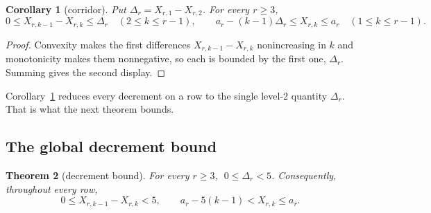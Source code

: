 \documentclass[11pt,a4paper]{article}
\theoremstyle{plain}
\newtheorem{theorem}{Theorem}[section]
\newtheorem{corollary}[theorem]{Corollary}
\theoremstyle{definition}
\theoremstyle{remark}
\begin{document}
\begin{corollary}[corridor]\label{cor:corridor}
Put $\Delta_r=X_{r,1}-X_{r,2}$. For every $r\ge3$,
\[
  0\le X_{r,k-1}-X_{r,k}\le\Delta_r\quad(2\le k\le r-1),
  \qquad
  a_r-(k-1)\Delta_r\le X_{r,k}\le a_r\quad(1\le k\le r-1).
\]
\end{corollary}

\begin{proof}
Convexity makes the first differences $X_{r,k-1}-X_{r,k}$ nonincreasing in $k$
and monotonicity makes them nonnegative, so each is bounded by the first one,
$\Delta_r$. Summing gives the second display.
\end{proof}

Corollary~\ref{cor:corridor} reduces every decrement on a row to the single
level-2 quantity $\Delta_r$. That is what the next theorem bounds.

\subsection{The global decrement bound}\label{sec:corridor}

\begin{theorem}[decrement bound]\label{thm:corridor}
For every $r\ge3$, $\;0\le\Delta_r<5$. Consequently, throughout every row,
\begin{equation}\label{eq:five}
  0\le X_{r,k-1}-X_{r,k}<5,
  \qquad
  a_r-5(k-1)<X_{r,k}\le a_r .
\end{equation}
\end{theorem}
\end{document}
